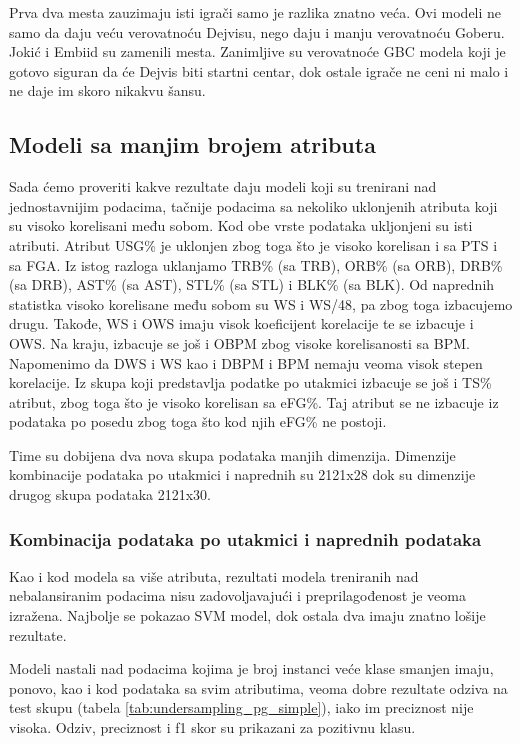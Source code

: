 \documentclass[a4paper]{article}
\begin{document}
Prva dva mesta zauzimaju isti igrači samo je razlika znatno veća. Ovi modeli ne samo da daju veću verovatnoću Dejvisu, nego daju i manju verovatnoću Goberu. Jokić i Embiid su zamenili mesta. Zanimljive su verovatnoće GBC modela koji je gotovo siguran da će Dejvis biti startni centar, dok ostale igrače ne ceni ni malo i ne daje im skoro nikakvu šansu.


\subsection{Modeli sa manjim brojem atributa}
\label{subsec:manje_atributa}

Sada ćemo proveriti kakve rezultate daju modeli koji su trenirani nad jednostavnijim podacima, tačnije podacima sa nekoliko uklonjenih atributa koji su visoko korelisani među sobom. Kod obe vrste podataka ukljonjeni su isti atributi. Atribut USG\% je uklonjen zbog toga što je visoko korelisan i sa PTS i sa FGA. Iz istog razloga uklanjamo TRB\% (sa TRB), ORB\% (sa ORB), DRB\% (sa DRB), AST\% (sa AST), STL\% (sa STL) i BLK\% (sa BLK). Od naprednih statistka visoko korelisane među sobom su WS i WS/48, pa zbog toga izbacujemo drugu. Takođe, WS i OWS imaju visok koeficijent korelacije te se izbacuje i OWS. Na kraju, izbacuje se još i OBPM zbog visoke korelisanosti sa BPM. Napomenimo da DWS i WS kao i DBPM i BPM nemaju veoma visok stepen korelacije. Iz skupa koji predstavlja podatke po utakmici izbacuje se još i TS\% atribut, zbog toga što je visoko korelisan sa eFG\%. Taj atribut se ne izbacuje iz podataka po posedu zbog toga što kod njih eFG\% ne postoji.

Time su dobijena dva nova skupa podataka manjih dimenzija. Dimenzije kombinacije podataka po utakmici i naprednih su 2121x28 dok su dimenzije drugog skupa podataka 2121x30.

\subsubsection{Kombinacija podataka po utakmici i naprednih podataka}
\label{subsubsec:kombo_pg_adv_simple}

Kao i kod modela sa više atributa, rezultati modela treniranih nad nebalansiranim podacima nisu zadovoljavajući i preprilagođenost je veoma izražena. Najbolje se pokazao SVM model, dok ostala dva imaju znatno lošije rezultate.

Modeli nastali nad podacima kojima je broj instanci veće klase smanjen imaju, ponovo, kao i kod podataka sa svim atributima, veoma dobre rezultate odziva na test skupu (tabela \ref{tab:undersampling_pg_simple}), iako im preciznost nije visoka. Odziv, preciznost i f1 skor su prikazani za pozitivnu klasu.
\end{document}
